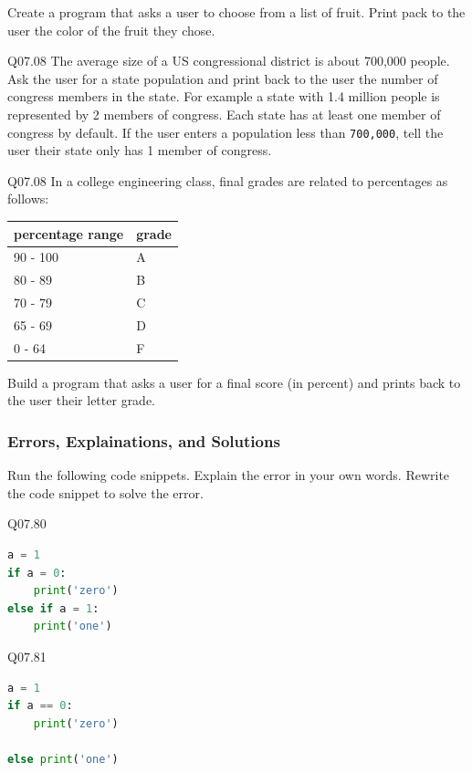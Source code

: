 \documentclass{book}
\newenvironment{problems}{}{}  %
\begin{document}
\begin{problems}
Create a program that asks a user to choose from a list of fruit. Print
pack to the user the color of the fruit they chose.

Q07.08 The average size of a US congressional district is about 700,000
people. Ask the user for a state population and print back to the user
the number of congress members in the state. For example a state with
1.4 million people is represented by 2 members of congress. Each state
has at least one member of congress by default. If the user enters a
population less than \lstinline!700,000!, tell the user their state only
has 1 member of congress.

Q07.08 In a college engineering class, final grades are related to
percentages as follows:

\begin{longtable}[]{@{}ll@{}}
\toprule
percentage range & grade\tabularnewline
\midrule
\endhead
90 - 100 & A\tabularnewline
80 - 89 & B\tabularnewline
70 - 79 & C\tabularnewline
65 - 69 & D\tabularnewline
0 - 64 & F\tabularnewline
\bottomrule
\end{longtable}

Build a program that asks a user for a final score (in percent) and
prints back to the user their letter grade.
        \end{problems}

    




    
        \subsubsection{Errors, Explainations, and
Solutions}\label{errors-explainations-and-solutions}

Run the following code snippets. Explain the error in your own words.
Rewrite the code snippet to solve the error.
    




    
        Q07.80

\begin{lstlisting}[language=Python]
a = 1
if a = 0:
    print('zero')
else if a = 1:
    print('one')
\end{lstlisting}
    




    
        Q07.81

\begin{lstlisting}[language=Python]
a = 1
if a == 0:
    print('zero')
    
else print('one')
\end{lstlisting}
    
\end{document}
